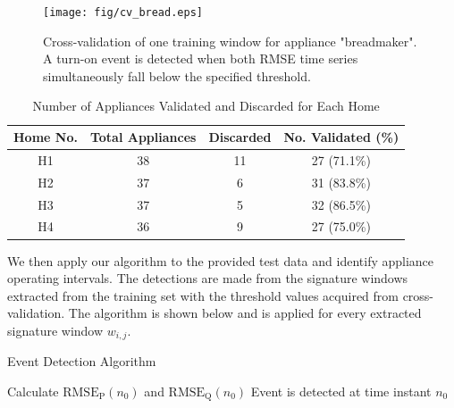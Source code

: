 \documentclass[conference]{IEEEtran}
\begin{document}
\begin{figure}[!t]
	\centering
	\texttt{[image: fig/cv\_bread.eps]}
	\caption{Cross-validation of one training window for appliance "breadmaker". A turn-on event is detected when both RMSE time series simultaneously fall below the specified threshold. }
	\label{fig:bread}
\end{figure}

\begin{table}[!t]
	\renewcommand{\arraystretch}{1.3}
	\caption{Number of Appliances Validated and Discarded for Each Home}\label{classes}
	\label{table:cv}
	\centering
	\begin{tabular}{c||c||c||c}
		\hline 
		\textbf{Home No.} & \textbf{Total Appliances} &\textbf{Discarded} &\textbf{No. Validated (\%)}\tabularnewline
		\hline 
		\hline 
		H1 & 38 & 11 & 27 (71.1\%)\tabularnewline
		\hline 
		H2 & 37 & 6 & 31 (83.8\%)\tabularnewline
		\hline 
		H3 & 37 & 5 & 32 (86.5\%)\tabularnewline
		\hline 
		H4 & 36 & 9 & 27 (75.0\%)\tabularnewline
		\hline 
	\end{tabular}
\end{table}


We then apply our algorithm to the provided test data and identify appliance operating intervals.  The detections are made from the signature windows extracted from the training set with the threshold values acquired from cross-validation.  The algorithm is shown below and is applied for every extracted signature window $w_{i,j}$.

\begin{algorithm}
	\caption{Event Detection Algorithm}\label{euclid}
	\begin{algorithmic}[1]
			\State Calculate $\text{RMSE}_{\text{P}}(n_0)$ and $\text{RMSE}_{\text{Q}}(n_0)$
			\State Event is detected at time instant $n_0$
			\EndIf
	\EndFor
	\end{algorithmic}
\end{algorithm}
\end{document}
